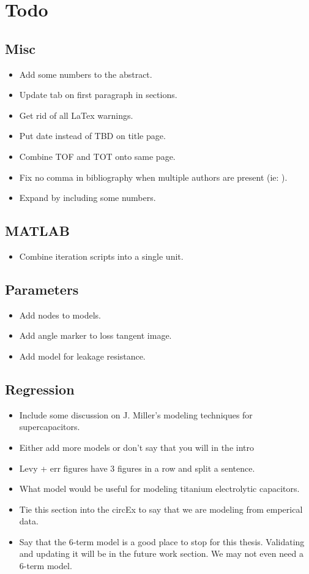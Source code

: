 \section{Todo}

\subsection{Misc}
\begin{itemize}
    \item Add some numbers to the abstract.
    \item Update tab on first paragraph in sections.
    \item Get rid of all LaTex warnings.
    \item Put date instead of TBD on title page.
    \item Combine TOF and TOT onto same page.
    \item Fix no comma in bibliography when multiple authors are present (ie: \cite{absCircuit}).
    \item Expand  by including some numbers.
\end{itemize}

\subsection{MATLAB}
\begin{itemize}
    \item Combine iteration scripts into a single unit.
\end{itemize}

\subsection{Parameters}
\begin{itemize}
    \item Add nodes to models.
    \item Add angle marker to loss tangent image.
    \item Add model for leakage resistance.
\end{itemize}

\subsection{Regression}
\begin{itemize}
    \item Include some discussion on J. Miller's modeling techniques for supercapacitors.
    \item Either add more models or don't say that you will in the intro
    \item Levy + err figures have 3 figures in a row and split a sentence.
    \item What model would be useful for modeling titanium electrolytic capacitors.
    \item Tie this section into the circEx to say that we are modeling from emperical data.
    \item Say that the 6-term model is a good place to stop for this thesis. Validating and updating it will be in the future work section. We may not even need a 6-term model.
\end{itemize}

